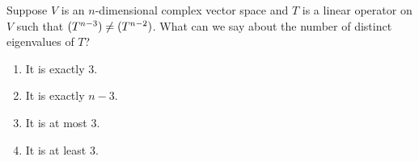 \documentclass{article}
\begin{document}
\noindent
\begin{minipage}{0.65\linewidth}
Suppose $V$ is an $n$-dimensional complex vector space and $T$ is a linear operator on $V$ such that
$\null(T^{n-3}) \neq \null(T^{n-2})$. What can we say about the number of distinct eigenvalues of $T$?
\end{minipage}

\begin{enumerate}
  \item It is exactly $3$.
  \item It is exactly $n-3$.
  \item It is at most $3$.
  \item It is at least $3$.
\end{enumerate}
\end{document}
